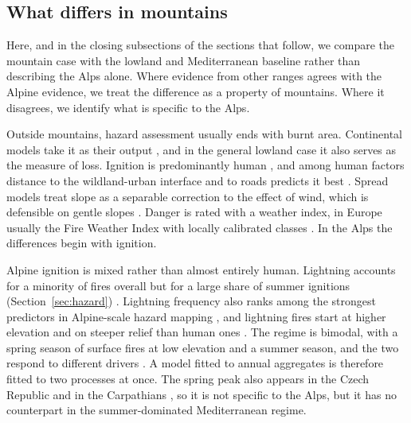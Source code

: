 \documentclass[11pt,a4paper]{article}
\begin{document}
\subsection{What differs in mountains}

Here, and in the closing subsections of the sections that follow, we compare the mountain case with the lowland and Mediterranean baseline rather than describing the Alps alone. Where evidence from other ranges agrees with the Alpine evidence, we treat the difference as a property of mountains. Where it disagrees, we identify what is specific to the Alps.

Outside mountains, hazard assessment usually ends with burnt area. Continental models take it as their output \citep{forrest_understanding_2024}, and in the general lowland case it also serves as the measure of loss. Ignition is predominantly human \citep{stoof_temperate_2024}, and among human factors distance to the wildland-urban interface and to roads predicts it best \citep{gelabert_assessing_2025}. Spread models treat slope as a separable correction to the effect of wind, which is defensible on gentle slopes \citep{hayajneh_wind_2026}. Danger is rated with a weather index, in Europe usually the Fire Weather Index with locally calibrated classes \citep{zacharakis_environmental_2023}. In the Alps the differences begin with ignition.

Alpine ignition is mixed rather than almost entirely human. Lightning accounts for a minority of fires overall but for a large share of summer ignitions (Section~\ref{sec:hazard}) \citep{valese_wildfires_2011}. Lightning frequency also ranks among the strongest predictors in Alpine-scale hazard mapping \citep{gerberding_mapping_2025}, and lightning fires start at higher elevation and on steeper relief than human ones \citep{conedera_lightninginduced_2006, valese_wildfires_2011}. The regime is bimodal, with a spring season of surface fires at low elevation and a summer season, and the two respond to different drivers \citep{valese_wildfires_2011, vacchiano_modeling_2018}. A model fitted to annual aggregates is therefore fitted to two processes at once. The spring peak also appears in the Czech Republic and in the Carpathians \citep{bercak_combination_2024, manczinger_fire_2025}, so it is not specific to the Alps, but it has no counterpart in the summer-dominated Mediterranean regime.
\end{document}
